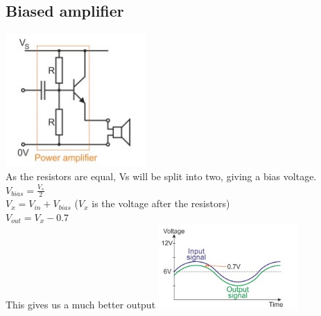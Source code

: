 \documentclass[a4paper, 11pt, twocolumn]{article}
\begin{document}
    \subsection{Biased amplifier}
    \includegraphics[width=0.4\textwidth]{biasedAmp.jpg}\\
    As the resistors are equal, Vs will be split into two, giving a bias voltage.\\
    $V_{bias} = \frac{V_s}{2}$\\
    $V_x = V_{in} + V_{bias}$ ($V_x$ is the voltage after the resistors) \\
    $V_{out} = V_x - 0.7$ \\
    This gives us a much better output
    \includegraphics[width=0.4\textwidth]{biasOut.jpg} \\
\end{document}
